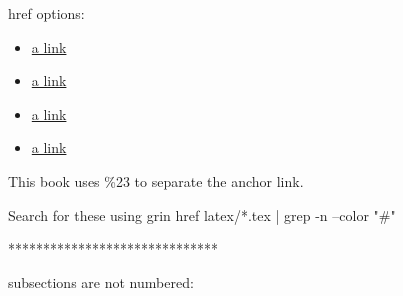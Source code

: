 
href options:
\begin{itemize}
    \item \href{https://en.wikipedia.org/wiki/Business_process%23Adam_Smith}{a link}
    \item \href{https://en.wikipedia.org/wiki/Business_process\%23Adam_Smith}{a link}
    \item \href{https://en.wikipedia.org/wiki/Business_process#Adam_Smith}{a link}
    \item \href{https://en.wikipedia.org/wiki/Business_process\#Adam_Smith}{a link}
\end{itemize}
This book uses \%23 to separate the anchor link. 

Search for these using
grin href latex/*.tex | grep -n --color "#"

******************************

subsections are not numbered: \subsection*{}